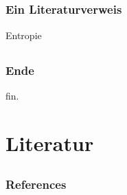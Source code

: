 \documentclass[18pt]{beamer}
\begin{document}
\subsection{}
\begin{frame}
\frametitle{Ein Literaturverweis}
\begin{center}
	Entropie~\cite{shannon48}
\end{center}
\end{frame}



\subsection{}
\begin{frame}
\frametitle{Ende}
\begin{center}
	fin.
\end{center}
\end{frame}



\section{Literatur}
\subsection{}
\begin{frame}
\frametitle{References}
\printbibliography 
\end{frame}
\end{document}
